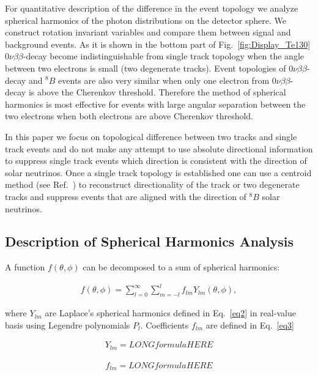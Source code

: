 \documentclass[12pt,twoside,letterpaper]{article}
\newcommand{\vbb}{0\nu\beta\beta}
\newcommand{\B}{^{8}B}
\begin{document}
For quantitative description of the difference in the event topology we analyze spherical harmonics of the photon distributions on the detector sphere. We construct rotation invariant variables and compare them between signal and background events. As it is shown in the bottom part of Fig.~\ref{fig:Display_Te130} $\vbb$-decay become indistinguishable from single track topology when the angle between two electrons is small (two degenerate tracks). Event topologies of $\vbb$-decay and $\B$ events are also very similar when only one electron from $\vbb$-decay is above the Cherenkov threshold. Therefore the method of spherical harmonics is most effective for events with large angular separation between the two electrons when both electrons are above Cherenkov threshold. 

In this paper we focus on topological difference between two tracks and single track events and do not make any attempt to use absolute directional information to suppress single track events  which direction is consistent with the direction of solar neutrinos. Once a single track topology is established one can use a centroid method (see Ref.~\cite{Directionality}) to reconstruct directionality of the track or two degenerate tracks and suppress events that are aligned with the direction of $\B$ solar neutrinos.

\subsection{Description of Spherical Harmonics Analysis}
A function $f(\theta,\phi)$ can be decomposed to a sum of spherical harmonics:

\begin{eqnarray}
\label{eq1}
f(\theta,\phi) = \sum_{l=0}^{\infty} \sum_{m=-l}^{l} f_{lm} Y_{lm}(\theta,\phi),
\end{eqnarray}

where $Y_{lm}$ are Laplace's spherical harmonics defined in Eq.~\ref{eq2} in real-value basis using Legendre polynomials $P_l$. Coefficients $f_{lm}$ are defined in Eq.~\ref{eq3} 

\begin{eqnarray}
\label{eq2}
Y_{lm} = LONGformulaHERE
\end{eqnarray}

\begin{eqnarray}
\label{eq3}
f_{lm} = LONGformulaHERE
\end{eqnarray}
\end{document}
